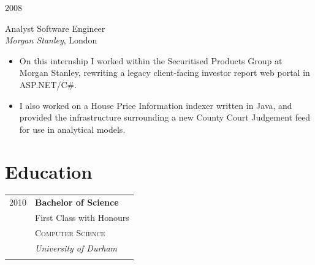 \documentclass[10pt]{article} %
\begin{document}
{\begin{minipage}[t]{0.5\textwidth}


\end{minipage} %
\hfill
\begin{minipage}[t]{0.44\textwidth} %
\vspace{0pt} %




{\raggedleft\textsc{2008}\par}

{\raggedright\large Analyst Software Engineer\\
\textit{Morgan Stanley}, London\\[5pt]}

\normalsize{
\begin{itemize}
	\item On this internship I worked within the Securitised Products Group at Morgan Stanley, rewriting a legacy client-facing investor report web portal in ASP.NET/C\#.
	\item I also worked on a House Price Information indexer written in Java, and provided the infrastructure surrounding a new County Court Judgement feed for use in analytical models.
\end{itemize}
}


\section{Education} 

\begin{tabular}{rl} %


2010 & \textbf{Bachelor of Science} \\ 
& \small First Class with Honours \\
& \textsc{Computer Science} \\ 
& \textit{University of Durham}\\
&\\
	 

\end{tabular}
\end{minipage}}
\end{document}
